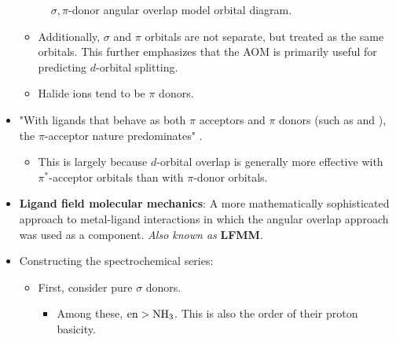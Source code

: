 \documentclass[../notes.tex]{subfiles}
\begin{document}
\begin{itemize}
\begin{figure}[h!]
        \caption{$\sigma,\pi$-donor  angular overlap model orbital diagram.}
        \label{fig:orbitalDiagram-AOMpiDon}
    \end{figure}
    \begin{itemize}
        \item Additionally, $\sigma$ and $\pi$ orbitals are not separate, but treated as the same orbitals. This further emphasizes that the AOM is primarily useful for predicting $d$-orbital splitting.
        \item Halide ions tend to be $\pi$ donors.
    \end{itemize}
    \item "With ligands that behave as both $\pi$ acceptors and $\pi$ donors (such as  and ), the $\pi$-acceptor nature predominates" \parencite[388]{bib:MiesslerFischerTarr}.
    \begin{itemize}
        \item This is largely because $d$-orbital overlap is generally more effective with $\pi^*$-acceptor orbitals than with $\pi$-donor orbitals.
    \end{itemize}
    \item \textbf{Ligand field molecular mechanics}: A more mathematically sophisticated approach to metal-ligand interactions in which the angular overlap approach was used as a component. \emph{Also known as} \textbf{LFMM}.
    \item Constructing the spectrochemical series:
    \begin{itemize}
        \item First, consider pure $\sigma$ donors.
        \begin{itemize}
            \item Among these, $\text{en}>\ce{NH3}$. This is also the order of their proton basicity.

\end{itemize}
\end{itemize}
\end{itemize}
\end{document}
